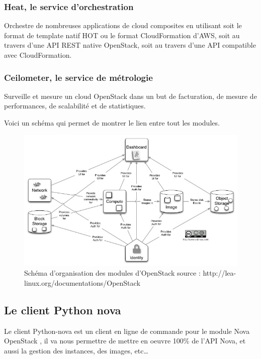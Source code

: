 \documentclass[]{article}
\begin{document}
\subsubsection{Heat, le service
d'orchestration}\label{heat-le-service-dorchestration}

Orchestre de nombreuses applications de cloud composites en utilisant
soit le format de template natif HOT ou le format CloudFormation d'AWS,
soit au travers d'une API REST native OpenStack, soit au travers d'une
API compatible avec CloudFormation.

\subsubsection{Ceilometer, le service de
métrologie}\label{ceilometer-le-service-de-muxe9trologie}

Surveille et mesure un cloud OpenStack dans un but de facturation, de
mesure de performances, de scalabilité et de statistiques.

Voici un schéma qui permet de montrer le lien entre tout les modules.

\begin{figure}
\centering
\includegraphics{Images/Openstack_diagramme_conceptuel.jpg}
\caption{Schéma d'organisation des modules d'OpenStack \footnotesize{source : http://lea-linux.org/documentations/OpenStack} }
\end{figure}

\subsection{Le client Python nova}\label{le-client-python-nova}

Le client Python-nova est un client en ligne de commande pour le module
Nova OpenStack , il va nous permettre de mettre en oeuvre 100\% de l'API
Nova, et aussi la gestion des instances, des images, etc\ldots{}
\end{document}
